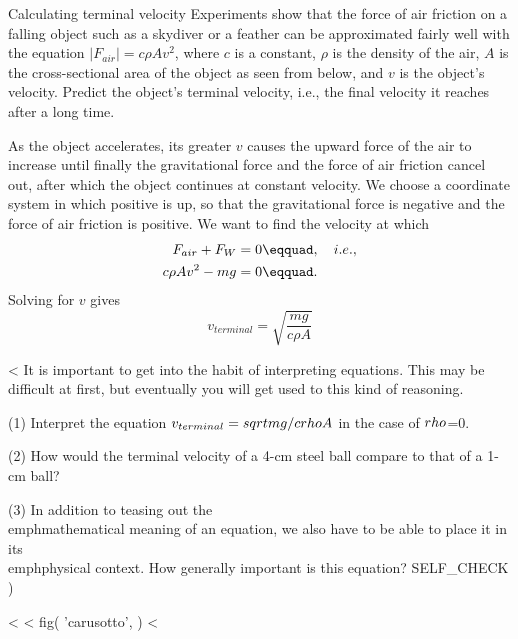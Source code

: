 \begin{eg}{Calculating terminal velocity}
\egquestion Experiments show that the force of air friction on
a falling object such as a skydiver or a feather can be
approximated fairly well with the equation 
$|F_{air}|=c\rho Av^2$, where $c$ is a constant, $\rho$ is the density of the
air, $A$ is the cross-sectional area of the object as seen
from below, and $v$ is the object's velocity. Predict the
object's terminal velocity, i.e., the final velocity it
reaches after a long time.

\eganswer As the object accelerates, its greater $v$ causes
the upward force of the air to increase until finally the
gravitational force and the force of air friction cancel
out, after which the object continues at constant velocity.
We choose a coordinate system in which positive is up, so
that the gravitational force is negative and the force of
air friction is positive. We want to find the velocity at which
\begin{align*}
        F_{air}+ F_W     &=     0\eqquad, \quad i.e.,  \\
        c\rho Av ^2- mg     &=     0\eqquad.
\end{align*}
Solving for $v$ gives
\begin{equation*}
        v_{terminal}  = \sqrt{\frac{mg}{c\rho A}}
\end{equation*}
\end{eg}

<%
It is important to get into the habit of interpreting
equations. This may be difficult at first,
but eventually you will get used to this kind of reasoning.

(1) Interpret the equation $v_{terminal}=\\sqrt{mg/c\\rho A}$ in the case of $\\rho $=0.

(2) How would the terminal velocity of a 4-cm steel ball
compare to that of a 1-cm ball?

(3) In addition to teasing out the \\emph{mathematical} meaning of
an equation, we also have to be able to place it in its \\emph{physical}
context. How generally important is this equation?
  SELF_CHECK
  ) %

<%
<%
  fig(
    'carusotto',
  )
<%


